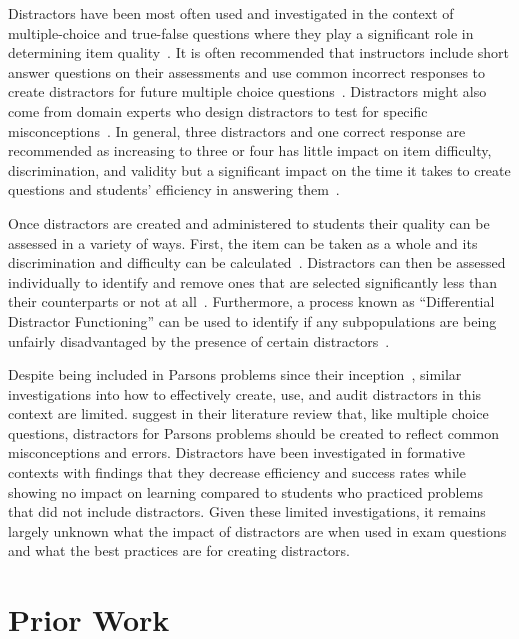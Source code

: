 \documentclass[]{acmart}
\begin{document}
Distractors have been most often used and investigated in the context of
multiple-choice and true-false questions where they play a significant role in
determining item quality~\cite{gierl2017developing}. It is often recommended
that instructors include short answer questions on their assessments and use
common incorrect responses to create distractors for future multiple choice
questions~\cite{briggs2006diagnostic}.  Distractors might also come from domain
experts who design distractors to test for specific
misconceptions~\cite{guttman1967systematic}. In general, three distractors and one correct response are
recommended as increasing to three or four has little impact on item difficulty,
discrimination, and validity but a significant impact on the time it takes to
create questions and students' efficiency in answering them~\cite{vyas2008multiple}.

Once distractors are created and administered to students their quality can be
assessed in a variety of ways. First, the item can be taken as a whole and its
discrimination and difficulty can be calculated~\cite{mahjabeen2017difficulty}.
Distractors can then be assessed individually to identify and remove ones that are
selected significantly less than their counterparts or not at all~\cite{tarrant2009assessment}.  Furthermore, a process known as
``Differential Distractor Functioning'' can be used to identify if any
subpopulations are being unfairly disadvantaged by the presence of certain
distractors~\cite{green1989method}.

Despite being included in Parsons problems since their
inception~\cite{parsons2006parson}, similar investigations into how to
effectively create, use, and audit distractors in this context
are limited. \citet{du2020review} suggest in their literature review that, like
multiple choice questions, distractors for Parsons problems should be created to
reflect common misconceptions and errors. Distractors have been investigated in
formative contexts with \citet{harms2016distractors} findings that they decrease
efficiency and success rates while showing no impact on learning compared to
students who practiced problems that did not include distractors. Given these
limited investigations, it remains largely unknown what the impact of distractors
are when used in exam questions and what the best practices are for creating
distractors.

\section{Prior Work}
\end{document}
